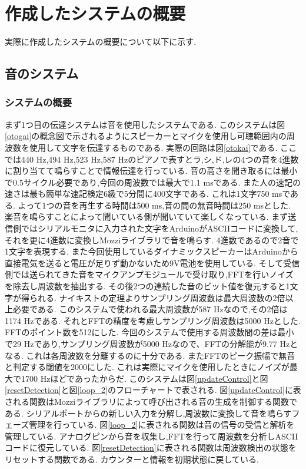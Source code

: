 \section{作成したシステムの概要}
実際に作成したシステムの概要について以下に示す.

\subsection{音のシステム}
\subsubsection{システムの概要}
まず1つ目の伝達システムは音を使用したシステムである.
このシステムは図\ref{otogai}の概念図で示されるようにスピーカーとマイクを使用し可聴範囲内の周波数を使用して文字を伝達するものである.
実際の回路は図\ref{otokai}である.
ここでは440 Hz,494 Hz,523 Hz,587 Hzのピアノで表すとラ,シ,ド,レの4つの音を4進数に割り当てて鳴らすことで情報伝達を行っている.
音の高さを聞き取るには最小で0.5サイクル必要であり,今回の周波数では最大で1.1 msである\cite{nagasa}.
また人の速記の速さは最も簡単な速記検定6級で5分間に400文字である\cite{sokki}.
これは1文字750 msである.
よって1つの音を再生する時間は500 ms,音の間の無音時間は250 msとした.
楽音を鳴らすことによって聞いている側が聞いていて楽しくなっている.
まず送信側ではシリアルモニタに入力された文字をArduinoがASCIIコードに変換して,それを更に4進数に変換しMozziライブラリで音を鳴らす\cite{mozzi}.
4進数であるので2音で1文字を表現する.
また今回使用しているダイナミックスピーカーはArduinoから直接電気を送ると電圧が足りず動かないため9V電池を使用している.
そして受信側では送られてきた音をマイクアンプモジュールで受け取り,FFTを行いノイズを除去し周波数を抽出する.
その後2つの連続した音のビット値を復元すると1文字が得られる.
ナイキストの定理よりサンプリング周波数は最大周波数の2倍以上必要である.
このシステムで使われる最大周波数が587 Hzなので,その2倍は1174 Hzである.
それとFFTの精度を考慮しサンプリング周波数は5000 Hzとした.
FFTのポイント数を512にした.
今回のシステムで使用する周波数間の差は最小で29 Hzであり,サンプリング周波数が5000 Hzなので、FFTの分解能が9.77 Hzとなる.
これは各周波数を分離するのに十分である.
またFFTのピーク振幅で無音と判定する閾値を2000にした.
これは実際にマイクを使用したときにノイズが最大で1700 Hzほどであったからだ.
このシステムは図\ref{updateControl}と図\ref{resetDetection}と図\ref{loop_2}のフローチャートで表される.
図\ref{updateControl}に表される関数はMozziライブラリによって呼び出される音の生成を制御する関数である.
シリアルポートからの新しい入力を分解し,周波数に変換して音を鳴らすフェーズ管理を行っている.
図\ref{loop_2}に表される関数は音の信号の受信と解析を管理している.
アナログピンから音を収集し,FFTを行って周波数を分析しASCIIコードに復元している.
図\ref{resetDetection}に表される関数は周波数検出の状態をリセットする関数である.
カウンターと情報を初期状態に戻している.


